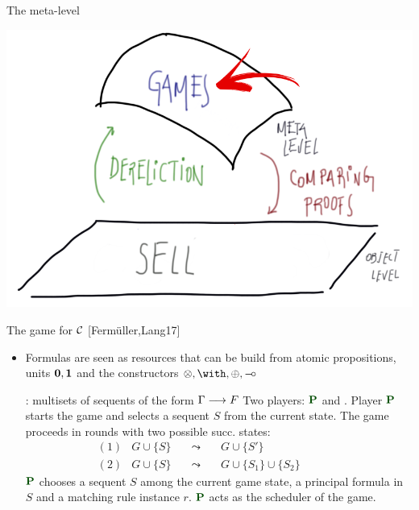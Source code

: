 \documentclass[9pt]{beamer}
\renewcommand{\emph}[1]{{\color{blue} #1}}
\newcommand{\emphdb}[1]{{\color{darkblue} #1}}
\newcommand{\emphb}[1]{{\color{darkvio} #1}}
\newcommand{\emphdo}[1]{{\color{darkorange} #1}}
\begin{document}
\begin{frame}{The meta-level}
\begin{center}
\includegraphics[scale=0.35]{../figs/LF10}
\end{center}
\end{frame}


\begin{frame}{The game for $\mathcal{C}$ \emphdb{[Ferm\"{u}ller,Lang17]}}
\begin{itemize}
	\item \emph{Formulas} are seen as \emphb{resources} that can be build from atomic propositions, units ${\bf 0}, {\bf 1}$  and the constructors $ \otimes, \with, \oplus,\limp$

	\xitem \emph{States}: multisets of sequents of the form $\Gamma \longrightarrow F$
	\xitem Two players: $\PP$ and \OO. Player   $\PP$ starts the game and selects  a sequent $S$ from the current state.
	\xitem The game proceeds in rounds with two possible succ. states: 
	\[
\begin{array}{llllll}
{(1)} &G\cup\{S\}\quad&\leadsto&\quad G\cup\{S'\} & \qquad &\\
{(2)} &G\cup\{S\}\quad&\leadsto&\quad G\cup\{S_1\}\cup\{S_2\} & \qquad &
\end{array}
\]
\xitem  $\PP$ chooses a sequent $S$ among the current game state, a principal formula in $S$ and a matching rule instance $r$. 
\xitem $\PP$  acts as the \emphdo{scheduler} of the game.
\end{itemize}
\end{frame}
\end{document}
